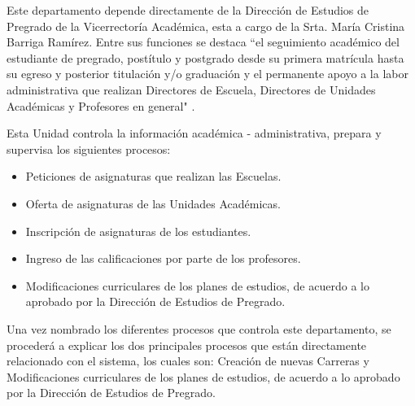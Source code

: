 		Este departamento depende directamente de la Dirección de Estudios de Pregrado de la Vicerrectoría Académica, esta a cargo de la Srta. María Cristina Barriga Ramírez. Entre sus funciones se destaca ``el seguimiento académico del estudiante de pregrado, postítulo y postgrado desde su primera matrícula hasta su egreso y posterior titulación y/o graduación y el permanente apoyo a la labor administrativa que realizan Directores de Escuela, Directores de Unidades Académicas y Profesores en general"\hspace{0.2cm} \cite{Dir15}.
		
		
		
		
		
		
		
		Esta Unidad  controla la información académica - administrativa, prepara y supervisa los siguientes procesos:
		\begin{itemize}
			\item Peticiones de asignaturas que realizan las Escuelas.
			\item Oferta de asignaturas de las Unidades Académicas.
			\item Inscripción de asignaturas de los estudiantes.
			\item Ingreso de las calificaciones por parte de los profesores.
			\item Modificaciones curriculares de los planes de estudios, de acuerdo  a lo aprobado por la Dirección de Estudios de Pregrado.
			
		\end{itemize}
		
		
		Una vez nombrado los diferentes procesos que controla este departamento, se procederá a explicar los dos  principales procesos que están directamente relacionado con el sistema, los cuales son: Creación de nuevas Carreras y  Modificaciones curriculares de los planes de estudios, de acuerdo  a lo aprobado por la Dirección de Estudios de Pregrado.
		
		
